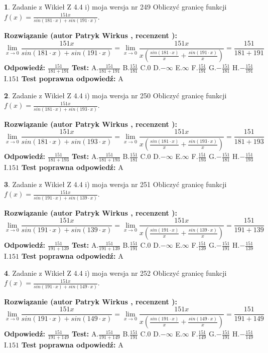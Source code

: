 \documentclass[12pt, a4paper]{article}
\theoremstyle{definition} %
\newtheorem{zad}{}
\newcommand{\zadStart}[1]{\begin{zad}#1\newline}
\newcommand{\zadStop}{\end{zad}}
\newcommand{\rozwStart}[2]{\noindent \textbf{Rozwiązanie (autor #1 , recenzent #2): }\newline}
\newcommand{\rozwStop}{\newline}
\newcommand{\odpStart}{\noindent \textbf{Odpowiedź:}\newline}
\newcommand{\odpStop}{\newline}
\newcommand{\testStart}{\noindent \textbf{Test:}\newline}
\newcommand{\testStop}{\newline}
\newcommand{\kluczStart}{\noindent \textbf{Test poprawna odpowiedź:}\newline}
\newcommand{\kluczStop}{\newline}
\begin{document}
\zadStart{Zadanie z Wikieł Z 4.4 i) moja wersja nr 249}
Obliczyć granicę funkcji $f(x)=\frac{151x}{sin(181\cdot x) +sin(191\cdot x)}$.
\zadStop
\rozwStart{Patryk Wirkus}{}
$$\lim\limits_{x\to 0}\frac{151x}{sin(181\cdot x) +sin(191\cdot x)}=\lim\limits_{x\to 0}\frac{151x}{x(\frac{sin(181\cdot x)}{x}+\frac{sin(191\cdot x)}{x})}=\frac{151}{181+191}$$
\rozwStop
\odpStart
$\frac{151}{181+191}$
\odpStop
\testStart
A.$\frac{151}{181+191}$
B.$\frac{151}{181}$
C.$0$
D.$-\infty$
E.$\infty$
F.$\frac{151}{191}$
G.$-\frac{151}{181}$
H.$-\frac{151}{191}$
I.$151$
\testStop
\kluczStart
A
\kluczStop



\zadStart{Zadanie z Wikieł Z 4.4 i) moja wersja nr 250}
Obliczyć granicę funkcji $f(x)=\frac{151x}{sin(181\cdot x) +sin(193\cdot x)}$.
\zadStop
\rozwStart{Patryk Wirkus}{}
$$\lim\limits_{x\to 0}\frac{151x}{sin(181\cdot x) +sin(193\cdot x)}=\lim\limits_{x\to 0}\frac{151x}{x(\frac{sin(181\cdot x)}{x}+\frac{sin(193\cdot x)}{x})}=\frac{151}{181+193}$$
\rozwStop
\odpStart
$\frac{151}{181+193}$
\odpStop
\testStart
A.$\frac{151}{181+193}$
B.$\frac{151}{181}$
C.$0$
D.$-\infty$
E.$\infty$
F.$\frac{151}{193}$
G.$-\frac{151}{181}$
H.$-\frac{151}{193}$
I.$151$
\testStop
\kluczStart
A
\kluczStop



\zadStart{Zadanie z Wikieł Z 4.4 i) moja wersja nr 251}
Obliczyć granicę funkcji $f(x)=\frac{151x}{sin(191\cdot x) +sin(139\cdot x)}$.
\zadStop
\rozwStart{Patryk Wirkus}{}
$$\lim\limits_{x\to 0}\frac{151x}{sin(191\cdot x) +sin(139\cdot x)}=\lim\limits_{x\to 0}\frac{151x}{x(\frac{sin(191\cdot x)}{x}+\frac{sin(139\cdot x)}{x})}=\frac{151}{191+139}$$
\rozwStop
\odpStart
$\frac{151}{191+139}$
\odpStop
\testStart
A.$\frac{151}{191+139}$
B.$\frac{151}{191}$
C.$0$
D.$-\infty$
E.$\infty$
F.$\frac{151}{139}$
G.$-\frac{151}{191}$
H.$-\frac{151}{139}$
I.$151$
\testStop
\kluczStart
A
\kluczStop



\zadStart{Zadanie z Wikieł Z 4.4 i) moja wersja nr 252}
Obliczyć granicę funkcji $f(x)=\frac{151x}{sin(191\cdot x) +sin(149\cdot x)}$.
\zadStop
\rozwStart{Patryk Wirkus}{}
$$\lim\limits_{x\to 0}\frac{151x}{sin(191\cdot x) +sin(149\cdot x)}=\lim\limits_{x\to 0}\frac{151x}{x(\frac{sin(191\cdot x)}{x}+\frac{sin(149\cdot x)}{x})}=\frac{151}{191+149}$$
\rozwStop
\odpStart
$\frac{151}{191+149}$
\odpStop
\testStart
A.$\frac{151}{191+149}$
B.$\frac{151}{191}$
C.$0$
D.$-\infty$
E.$\infty$
F.$\frac{151}{149}$
G.$-\frac{151}{191}$
H.$-\frac{151}{149}$
I.$151$
\testStop
\kluczStart
A
\kluczStop
\end{document}

